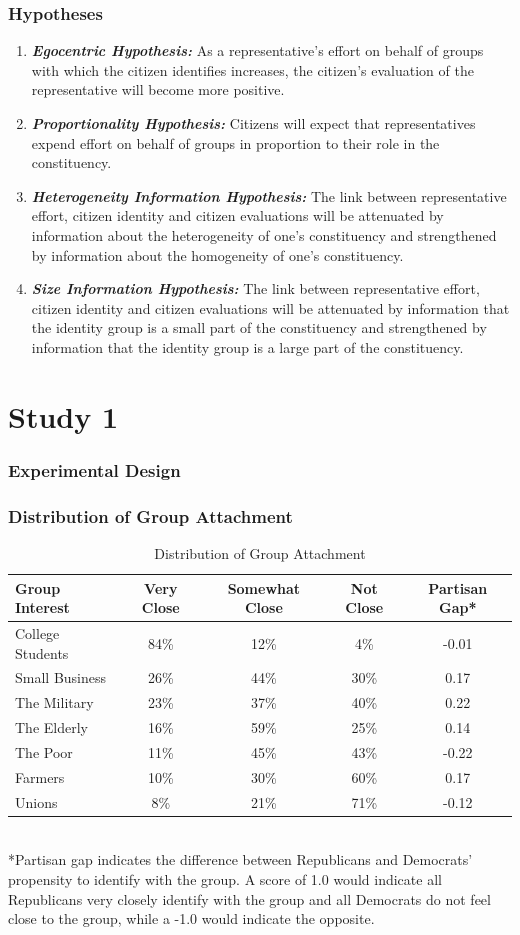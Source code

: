 \documentclass[14pt]{beamer}
\newcommand\e{\emph}
\newcommand\tb{\textbf}
\begin{document}
\begin{frame}
\footnotesize
\frametitle{Hypotheses}
\begin{enumerate}
	\item \tb{\e{Egocentric Hypothesis:}} As a representative's effort on behalf of groups with which the citizen identifies increases, the citizen's evaluation of the representative will become more positive. 
	\item \tb{\e{Proportionality Hypothesis:}} Citizens will expect that representatives expend effort on behalf of groups in proportion to their role in the constituency.
	\item \tb{\e{Heterogeneity Information Hypothesis:}} The link between representative effort, citizen identity and citizen evaluations will be attenuated by information about the heterogeneity of one’s constituency and strengthened by information about the homogeneity of one’s constituency. 
	\item \tb{\e{Size Information Hypothesis:}} The link between representative effort, citizen identity and citizen evaluations will be attenuated by information that the identity group is a small part of the constituency and strengthened by information that the identity group is a large part of the constituency. 
\end{enumerate}
\end{frame}

\section{Study 1}
\begin{frame}
\frametitle{Experimental Design}
\end{frame}

\begin{frame}
\frametitle{Distribution of Group Attachment}
\scriptsize
\begin{table}
	\centering
	\caption{Distribution of Group Attachment}
	\begin{tabulary}{\linewidth}{lc c c c}
		\\
		\hline 
		\tb{Group Interest}&\tb{Very Close}&\tb{Somewhat Close}&\tb{Not Close}&\tb{Partisan Gap*}\\
		\hline
		College Students&84\%&12\%&4\%&-0.01\\
		Small Business&26\%&44\%&30\%&0.17\\
		The Military& 23\%&37\%&40\%&0.22\\
		The Elderly&16\%&59\%&25\%&0.14\\
		The Poor&11\%&45\%&43\%&-0.22\\
		Farmers&10\%&30\%&60\%&0.17\\
		Unions&8\%&21\%&71\%&-0.12\\
		\hline
	\end{tabulary}\\
	*Partisan gap indicates the difference between Republicans and Democrats’ propensity to identify with the group. A score of 1.0 would indicate all Republicans very closely identify with the group and all Democrats do not feel close to the group, while a -1.0 would indicate the opposite.
\end{table}
\end{frame}
\end{document}
